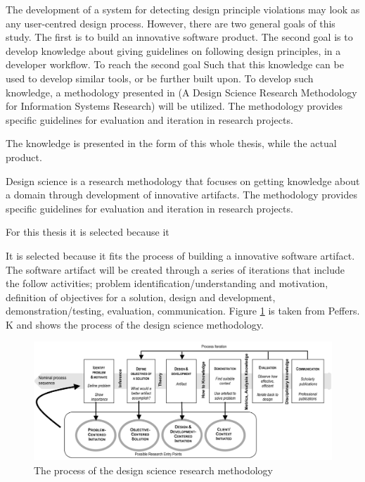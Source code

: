 \documentclass{report}
\begin{document}
The development of a system for detecting design principle violations may look as any user-centred design process. However, there are two general goals of this study. The first is to build an innovative software product. The second goal is to develop knowledge about giving guidelines on following design principles, in a developer workflow. To reach the second goal  Such that this knowledge can be used to develop similar tools, or be further built upon. To develop such knowledge, a methodology presented in (A Design Science Research Methodology for Information Systems Research) \cite{10.2753/MIS0742-1222240302} will be utilized. The methodology provides specific guidelines for evaluation and iteration in research projects. 

The knowledge is presented in the form of this whole thesis, while the actual product. 

Design science is a research methodology that focuses on getting knowledge about a domain through development of innovative artifacts. The methodology provides specific guidelines for evaluation and iteration in research projects. 

For this thesis it is selected because it 



It is selected because it fits the process of building a innovative software artifact. The software artifact will be created through a series of iterations that include the follow activities; problem identification/understanding and motivation, definition of objectives for a solution, design and development, demonstration/testing, evaluation, communication. Figure \ref{fig:designScience} is taken from Peffers. K \cite{Peffers2007ADS} and shows the process of the design science methodology. 

\begin{figure}[h!]
    \centering
    \includegraphics[width=\textwidth]{report/images/designScience.png}
    \caption{The process of the design science research methodology}
    \label{fig:designScience}
\end{figure}
\end{document}
